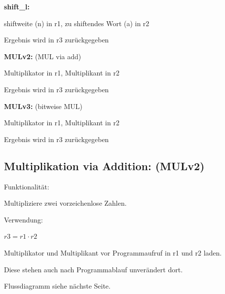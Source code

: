 \documentclass[fleqn, a4paper, 11pt]{article}       %
\begin{document}
  \vspace{0.2cm}

 \noindent \textbf{shift\_l:}
 \begin{compactitem}
     \item shiftweite (n) in r1, zu shiftendes Wort (a) in r2
     \item Ergebnis wird in r3 zurückgegeben
     \end{compactitem}
  
   \vspace{0.25cm}

 \noindent \textbf{MULv2:}  (MUL via add)
 \begin{compactitem}
     \item Multiplikator in r1, Multiplikant in r2
     \item Ergebnis wird in r3 zurückgegeben
     \end{compactitem}
   
    \vspace{0.25cm}

 \noindent \textbf{MULv3:}  (bitweise MUL)
 \begin{compactitem}
     \item Multiplikator in r1, Multiplikant in r2
     \item Ergebnis wird in r3 zurückgegeben
     \end{compactitem}


\newpage

\subsection{Multiplikation via Addition: (MULv2)\label{A.MULv2}}
Funktionalität: 

Multipliziere zwei vorzeichenlose Zahlen.
\vspace{0.25cm}

\noindent Verwendung:
\begin{compactitem}
    \item $r3 = r1 \cdot r2$
	\item Multiplikator und Multiplikant vor Programmaufruf  in r1  und r2 laden.
	\item Diese stehen auch nach Programmablauf unverändert   dort.
\end{compactitem}
\vspace{0.25cm}
\noindent Flussdiagramm siehe nächste Seite.

\thispagestyle{empty}


\newpage
\end{document}

